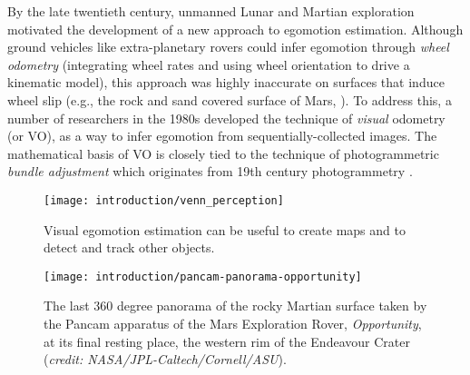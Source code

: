 By the late twentieth century, unmanned Lunar and Martian exploration motivated the development of a new approach to egomotion estimation. Although ground vehicles like extra-planetary rovers could infer egomotion through \textit{wheel odometry} (integrating wheel rates and using wheel orientation to drive a kinematic model), this approach was highly inaccurate on surfaces that induce wheel slip (e.g., the rock and sand covered surface of Mars, ). To address this, a number of researchers in the 1980s developed the technique of \textit{visual} odometry \citep{Scaramuzza2011-qr} (or VO), as a way to infer egomotion from sequentially-collected images. The mathematical basis of VO is closely tied to the technique of photogrammetric \textit{bundle adjustment} \citep{triggs_bundle_2000} which originates from 19th century photogrammetry \citep{albertz_look_2007}.

\begin{wrapfigure}{r}{0.5\textwidth}
	\centering
	\texttt{[image: introduction/venn\_perception]}
	\caption{Visual egomotion estimation can be useful to create maps and to detect and track other objects.}
	\label{fig:intro_state_venn}
	\vspace{-1.5em}
\end{wrapfigure}



% 
\begin{figure}
  \begin{center}
  	\vspace{-10pt}
    \texttt{[image: introduction/pancam-panorama-opportunity]}
     \vspace{-15pt}
  \end{center}
  \caption{The last 360 degree panorama of the rocky Martian surface taken by the Pancam apparatus of the Mars Exploration Rover, \textit{Opportunity}, at its final resting place, the western rim of the Endeavour Crater (\textit{credit: NASA/JPL-Caltech/Cornell/ASU}).}
    \label{fig:intro_endeavour_crater}
\end{figure}





